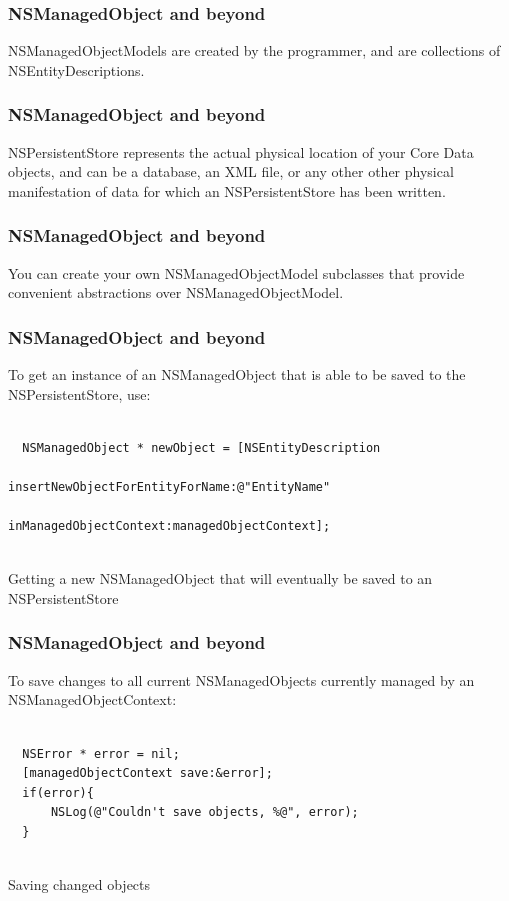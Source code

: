 \documentclass[10pt]{beamer}
\begin{document}
\begin{frame}[fragile]
  \frametitle{NSManagedObject and beyond}
  NSManagedObjectModels are created by the programmer, and are collections of NSEntityDescriptions.

\end{frame}

\begin{frame}[fragile]
  \frametitle{NSManagedObject and beyond}
  NSPersistentStore represents the actual physical location of your Core Data objects, and can be a database, an XML file, or any other other physical manifestation of data for which an NSPersistentStore has been written.

\end{frame}

\begin{frame}[fragile]
  \frametitle{NSManagedObject and beyond}
  You can create your own NSManagedObjectModel subclasses that provide convenient abstractions over NSManagedObjectModel.

\end{frame}

\begin{frame}[fragile]
  \frametitle{NSManagedObject and beyond}
  To get an instance of an NSManagedObject that is able to be saved to the NSPersistentStore, use:
\begin{listing}[H]
    \begin{verbatim}
  
  NSManagedObject * newObject = [NSEntityDescription
                                 insertNewObjectForEntityForName:@"EntityName"
                                 inManagedObjectContext:managedObjectContext];
                
  \end{verbatim}
    \caption{Getting a new NSManagedObject that will eventually be saved to an NSPersistentStore}
    \label{listing:39}
  \end{listing}

\end{frame}

\begin{frame}[fragile]
  \frametitle{NSManagedObject and beyond}
  To save changes to all current NSManagedObjects currently managed by an NSManagedObjectContext:
\begin{listing}[H]
    \begin{verbatim}
  
  NSError * error = nil;
  [managedObjectContext save:&error];
  if(error){
      NSLog(@"Couldn't save objects, %@", error);
  } 
                
  \end{verbatim}
    \caption{Saving changed objects}
    \label{listing:40}
  \end{listing}

\end{frame}
\end{document}
